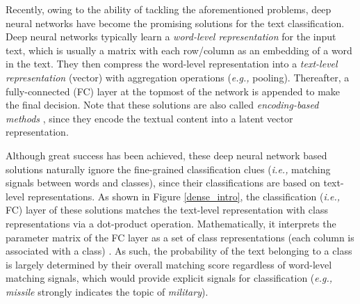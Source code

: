 \documentclass[letterpaper]{article} %
\newcommand{\ie}{\emph{i.e., }}
\newcommand{\eg}{\emph{e.g., }}
\begin{document}
Recently, owing to the ability of tackling the aforementioned problems, deep neural networks \cite{TextCNN,dan,vdcnn,TextRNN,fasttext} have become the promising solutions for the text classification. Deep neural networks typically learn a \textit{word-level representation} for the input text, which is usually a matrix with each row/column as an embedding of a word in the text. They then compress the word-level representation into a \textit{text-level representation} (vector) with aggregation operations (\eg pooling). Thereafter, a fully-connected (FC) layer at the topmost of the network is appended to make the final decision. Note that these solutions are also called \textit{encoding-based methods} \cite{encoder}, since they encode the textual content into a latent vector representation.

Although great success has been achieved, these deep neural network based solutions naturally ignore the fine-grained classification clues (\ie matching signals between words and classes), since their classifications are based on text-level representations. As shown in Figure \ref{dense_intro}, the classification (\ie FC) layer of these solutions matches the text-level representation with class representations via a dot-product operation. Mathematically, it interprets the parameter matrix of the FC layer as a set of class representations (each column is associated with a class) \cite{output}. As such, the probability of the text belonging to a class is largely determined by their overall matching score regardless of word-level matching signals, which would provide explicit signals for classification (\eg \textit{missile} strongly indicates the topic of \textit{military}).%
\end{document}
